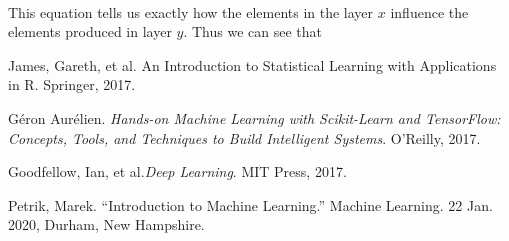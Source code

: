 \documentclass[12pt,letterpaper]{article}
\begin{document}
\paragraph*{}This equation tells us exactly how the elements in the layer $x$ influence the elements produced in layer $y$. Thus we can see that 


\begin{thebibliography}{9}


James, Gareth, et al. {An Introduction to Statistical Learning with Applications in R}. Springer, 2017.

Géron Aurélien. \textit{Hands-on Machine Learning with Scikit-Learn and TensorFlow: Concepts, Tools, and Techniques to Build Intelligent Systems}. O'Reilly, 2017.

Goodfellow, Ian, et al.\textit{Deep Learning}. MIT Press, 2017.

Petrik, Marek. “Introduction to Machine Learning.” Machine Learning. 22 Jan. 2020, Durham, New Hampshire.

\end{thebibliography}

\end{document}
